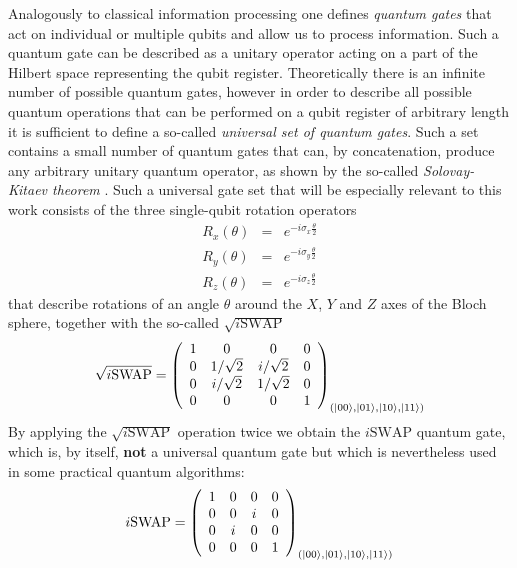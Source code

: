Analogously to classical information processing one defines {\it quantum gates} that act on individual or multiple qubits and allow us to process information. Such a quantum gate can be described as a unitary operator acting on a part of the Hilbert space representing the qubit register. Theoretically there is an infinite number of possible quantum gates, however in order to describe all possible quantum operations that can be performed on a qubit register of arbitrary length it is sufficient to define a so-called {\it universal set of quantum gates}. Such a set contains a small number of quantum gates that can, by concatenation, produce any arbitrary unitary quantum operator, as shown by the so-called {\it Solovay-Kitaev theorem} \citep{nielsen_quantum_2000,dawson_solovay-kitaev_2005}. Such a universal gate set that will be especially relevant to this work consists of the three single-qubit rotation operators
%
\begin{eqnarray}
   R_x(\theta)  & = & e^{-i\sigma_x\frac{\theta}{2}} \\ 
   R_y(\theta)  & = & e^{-i\sigma_y\frac{\theta}{2}} \\ 
   R_z(\theta)  & = & e^{-i\sigma_z\frac{\theta}{2}} 
\label{eq:universal_single_qubit_gates}
\end{eqnarray}
%
that describe rotations of an angle $\theta$ around the $X$, $Y$ and $Z$ axes of the Bloch sphere, together with the so-called $\sqrt{i\mathrm{SWAP}}$
%
\begin{equation}
\sqrt{i\mathrm{SWAP}} = \left( \begin{array}{cccc} 1 & 0 & 0 & 0 \\ 0 & 1/\sqrt{2} & i/\sqrt{2} & 0 \\ 0 & i/\sqrt{2} & 1/\sqrt{2} & 0 \\ 0 & 0 & 0 & 1  \end{array}  \right)_{(\left| 00 \right>,\left| 01 \right>,\left| 10 \right>,\left| 11 \right>)}
\end{equation}
%
By applying the $\sqrt{i\mathrm{SWAP}}$ operation twice we obtain the $i\mathrm{SWAP}$ quantum gate, which is, by itself, \textbf{not} a universal quantum gate but which is nevertheless used in some practical quantum algorithms:
%
\begin{equation}
i\mathrm{SWAP} = \left( \begin{array}{cccc} 1 & 0 & 0 & 0 \\ 0 & 0 & i & 0 \\ 0 & i & 0 & 0 \\ 0 & 0 & 0 & 1  \end{array}  \right)_{(\left| 00 \right>,\left| 01 \right>,\left| 10 \right>,\left| 11 \right>)}
\end{equation}
%

